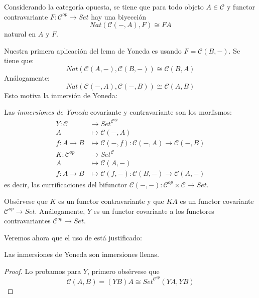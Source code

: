 \documentclass[12pt, twoside]{book}
\newcommand{\cat}{{\mathcal{C}}}
\newcommand{\Set}{{Set}}
\begin{document}
\begin{remark}
Considerando la categoría opuesta, se tiene que para todo objeto $A \in \cat$ y functor contravariante $F \colon \cat^{op} \to \Set$ hay una biyección
\[ Nat(\cat(-,A), F) \cong F A\]
natural en $A$ y $F$.
\end{remark}

Nuestra primera aplicación del lema de Yoneda es usando $F = \cat(B,-)$.
Se tiene que:
\[ Nat(\cat(A,-),\cat(B,-)) \cong \cat(B,A) \]
Análogamente:
\[ Nat(\cat(-,A),\cat(-,B)) \cong \cat(A,B) \]
Esto motiva la inmersión de Yoneda:
\begin{definition}
Las \emph{inmersiones de Yoneda} covariante y contravariante son los morfismos:
\begin{align*} 
  Y \colon \cat & \to \Set^{\cat^{op}}\\
  A & \mapsto \cat(-,A)\\
  f \colon A \to B & \mapsto \cat(-,f) \colon \cat(-,A) \to \cat(-,B)
\end{align*}
\begin{align*} 
  K \colon \cat^{op} & \to \Set^{\cat}\\
  A & \mapsto \cat(A,-)\\
  f \colon A \to B & \mapsto \cat(f,-) \colon \cat(B,-) \to \cat(A,-)
\end{align*}
es decir, las currificaciones del bifunctor $\cat(-,-) \colon \cat^{op} \times \cat \to \Set$.
\end{definition}
Obsérvese que $K$ es un functor contravariante y que $K A$ es un functor covariante $\cat^{op} \to \Set$.
Análogamente, $Y$ es un functor covariante a los functores contravariantes $\cat^{op} \to \Set$.

Veremos ahora que el uso de  está justificado:
\begin{proposition}
Las inmersiones de Yoneda son inmersiones llenas.
\end{proposition}
\begin{proof}
Lo probamos para $Y$, primero obsérvese que
\[ \cat(A,B) = (Y B)A \cong \Set^{\cat^{op}}(Y A, Y B)\]

\end{proof}
\backmatter




\printindex
\end{document}
